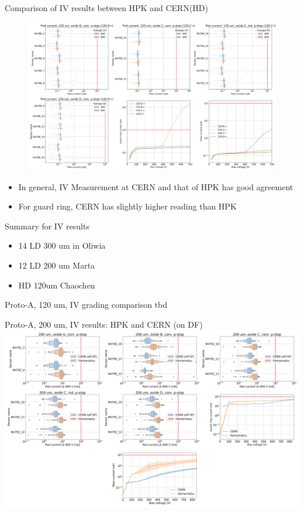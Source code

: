 \documentclass{beamer}
\begin{document}
\begin{frame}{Comparison of IV results between HPK and CERN(HD)}
  \begin{figure}
    \includegraphics[width=.7\textwidth]{plots/IV_CERN_HPK_120um.png}
  \end{figure}
  \begin{itemize}
    \scriptsize
      \item In general, IV Measurement at CERN and that of HPK has \alert{good agreement}
      \item For \alert{guard ring}, CERN has slightly higher reading than HPK 
  \end{itemize}
\end{frame}

\begin{frame}{Summary for IV results}
    \begin{itemize}
        \item 14 LD 300 um in Oliwia
        \item 12 LD 200 um Marta
        \item HD 120um  Chaochen
    \end{itemize}
    
\end{frame}

\begin{frame}{Proto-A, 120 um, IV grading comparison}
  tbd
\end{frame}

\begin{frame}{Proto-A, 200 um, IV results: HPK and CERN (on DF)}
  \includegraphics[width=.8\textwidth]{plots/IV_Comparison_SensorsHPK_200um.png}
\end{frame}
\end{document}
